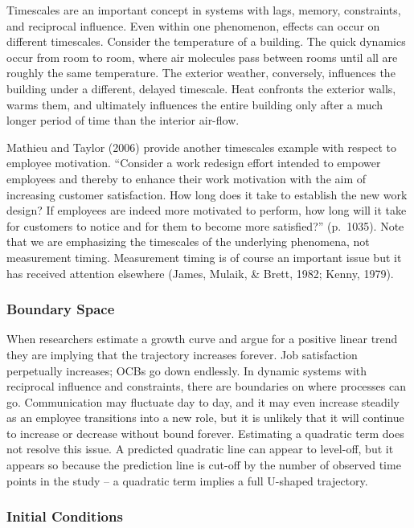 \documentclass[english,,man]{apa6}
\theoremstyle{definition}
\theoremstyle{definition}
\theoremstyle{definition}
\theoremstyle{remark}
\begin{document}
Timescales are an important concept in systems with lags, memory,
constraints, and reciprocal influence. Even within one phenomenon,
effects can occur on different timescales. Consider the temperature of a
building. The quick dynamics occur from room to room, where air
molecules pass between rooms until all are roughly the same temperature.
The exterior weather, conversely, influences the building under a
different, delayed timescale. Heat confronts the exterior walls, warms
them, and ultimately influences the entire building only after a much
longer period of time than the interior air-flow.

Mathieu and Taylor (2006) provide another timescales example with
respect to employee motivation. \enquote{Consider a work redesign effort
intended to empower employees and thereby to enhance their work
motivation with the aim of increasing customer satisfaction. How long
does it take to establish the new work design? If employees are indeed
more motivated to perform, how long will it take for customers to notice
and for them to become more satisfied?} (p.~1035). Note that we are
emphasizing the timescales of the underlying phenomena, not measurement
timing. Measurement timing is of course an important issue but it has
received attention elsewhere (James, Mulaik, \& Brett, 1982; Kenny,
1979).

\hypertarget{boundary-space}{%
\subsubsection{Boundary Space}\label{boundary-space}}

When researchers estimate a growth curve and argue for a positive linear
trend they are implying that the trajectory increases forever. Job
satisfaction perpetually increases; OCBs go down endlessly. In dynamic
systems with reciprocal influence and constraints, there are boundaries
on where processes can go. Communication may fluctuate day to day, and
it may even increase steadily as an employee transitions into a new
role, but it is unlikely that it will continue to increase or decrease
without bound forever. Estimating a quadratic term does not resolve this
issue. A predicted quadratic line can appear to level-off, but it
appears so because the prediction line is cut-off by the number of
observed time points in the study -- a quadratic term implies a full
U-shaped trajectory.

\hypertarget{initial-conditions}{%
\subsubsection{Initial Conditions}\label{initial-conditions}}
\end{document}
